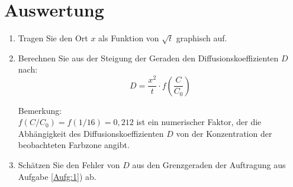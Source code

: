 \section{Auswertung} 

\begin{enumerate}
 \item Tragen Sie den Ort $x$ als Funktion von $\sqrt{t}$ graphisch auf. \label{Aufg:1}
 \item Berechnen Sie aus der Steigung der Geraden den Diffusionskoeffizienten $D$ nach:
  \begin{equation}
   D = \frac{x^2}{t}\cdot f\left(\frac{C}{C_0}\right)
  \end{equation}
	
	\noindent
	Bemerkung:\\ 
	\noindent
	$f\left(C/C_0\right) = f\left(1/16\right) = 0,212$ ist ein numerischer Faktor, der die Abhängigkeit des Diffusionskoeffizienten $D$ von der Konzentration der beobachteten Farbzone angibt.
 \item Schätzen Sie den Fehler von $D$ aus den Grenzgeraden der Auftragung aus Aufgabe \ref{Aufg:1}) ab.
\end{enumerate}